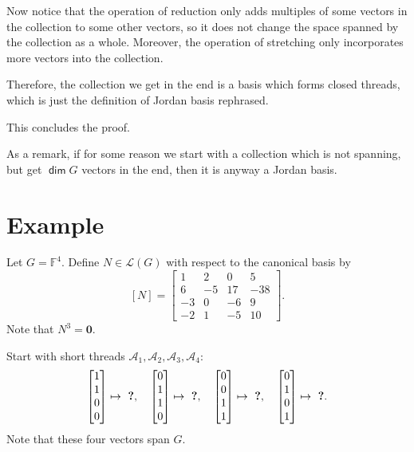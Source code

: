 \documentclass[12pt]{article}
\newcommand{\1}{\mathbf{1}}
\newcommand{\0}{\mathbf{0}}
\newcommand{\A}{\mathcal{A}}
\newcommand{\F}{\mathbb{F}}
\newcommand{\cL}{\mathcal{L}}
\DeclareMathOperator{\mydim}{\mathsf{dim}}
\theoremstyle{definition}
\begin{document}
Now notice that the operation of reduction only adds multiples of some vectors in the collection to some other vectors, so it does not change the space spanned by the collection as a whole.
Moreover, the operation of stretching only incorporates more vectors into the collection.

Therefore, the collection we get in the end is a basis which forms closed threads, which is just the definition of Jordan basis rephrased.

This concludes the proof.

As a remark, if for some reason we start with a collection which is not spanning, but get $\mydim G$ vectors in the end, then it is anyway a Jordan basis.

\section{Example}

Let $G=\F^4$.
Define $N \in \cL(G)$ with respect to the canonical basis by
\[
[N] = \left[\begin{matrix}1 & 2 & 0 & 5\\6 & -5 & 17 & -38\\-3 & 0 & -6 & 9\\-2 & 1 & -5 & 10\end{matrix}\right]
.
\]
Note that $N^3=\0$.

Start with short threads
$\A_1,\A_2,\A_3,\A_4$:
\[
\left[\begin{matrix}1 \\ 1 \\ 0 \\ 0\end{matrix}\right]
\mapsto
\text{ \bf ?}
, \ \ \
\left[\begin{matrix}0 \\ 1 \\ 1 \\ 0\end{matrix}\right]
\mapsto
\text{ \bf ?}
, \ \ \
\left[\begin{matrix}0 \\ 0 \\ 1 \\ 1\end{matrix}\right]
\mapsto
\text{ \bf ?}
, \ \ \
\left[\begin{matrix}0 \\ 1 \\ 0 \\ 1\end{matrix}\right]
\mapsto
\text{ \bf ?}
.
\]
Note that these four vectors span $G$.
\end{document}
